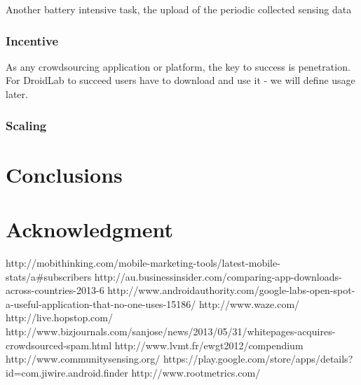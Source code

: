 \documentclass[conference,letterpaper]{IEEEtran}
\begin{document}
Another battery intensive task, the upload of the periodic collected sensing data 

\subsubsection{Incentive}
As any crowdsourcing application or platform, the key to success is penetration. For DroidLab to succeed users have to download and use it - we will define usage later. 
\subsubsection{Scaling}
\label{sec:solutions}
\section{Conclusions}
\label{sec:conclusion_and_future_work}
\section{Acknowledgment}
\label{sec:acknowledgment}
http://mobithinking.com/mobile-marketing-tools/latest-mobile-stats/a\#subscribers
http://au.businessinsider.com/comparing-app-downloads-across-countries-2013-6
http://www.androidauthority.com/google-labs-open-spot-a-useful-application-that-no-one-uses-15186/
http://www.waze.com/
http://live.hopstop.com/
http://www.bizjournals.com/sanjose/news/2013/05/31/whitepages-acquires-crowdsourced-spam.html
http://www.lvmt.fr/ewgt2012/compendium
http://www.communitysensing.org/
https://play.google.com/store/apps/details?id=com.jiwire.android.finder
http://www.rootmetrics.com/
\end{document}
